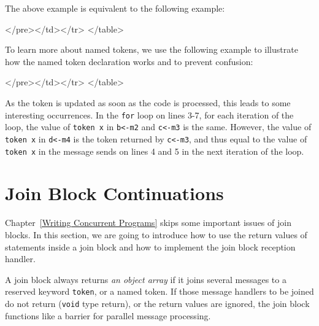 The above example is equivalent to the following example:
{\singlespace

}
\begin{htmlonly}

 \begin{rawhtml} 
   </pre></td></tr>
  </table>
\end{rawhtml} 
\end{htmlonly}

To learn more about named tokens, we use the following example to illustrate 
how the named token declaration works and to prevent confusion:
{\singlespace

}
\begin{htmlonly}

 \begin{rawhtml} 
   </pre></td></tr>
  </table>
\end{rawhtml} 
\end{htmlonly}

As the token is updated as soon as the code is processed, this leads to some interesting 
occurrences. In the {\tt for} loop on lines 3-7, for each iteration of the loop, the value of 
{\tt token x} in {\tt b{\textless}-m2} and {\tt c{\textless}-m3} is the same. However, 
the value of {\tt token x} in {\tt d{\textless}-m4} is the token returned by 
{\tt c{\textless}-m3}, and thus equal to the value of {\tt token x} in the message 
sends on lines 4 and 5 in the next iteration of the loop.

\section{Join Block Continuations}

Chapter~\ref{Writing Concurrent Programs} skips some important issues of join 
blocks. In this section, 
we are going to introduce how to use the return values of statements inside a join block and how to 
implement the join block reception handler.

A join block always returns \textit{an object array} if it joins 
several messages to a reserved keyword {\tt token}, or a named token. 
If those message handlers to be joined do not return
({\tt void} type return), or the return values are ignored, the join block 
functions like a barrier for parallel message processing.

